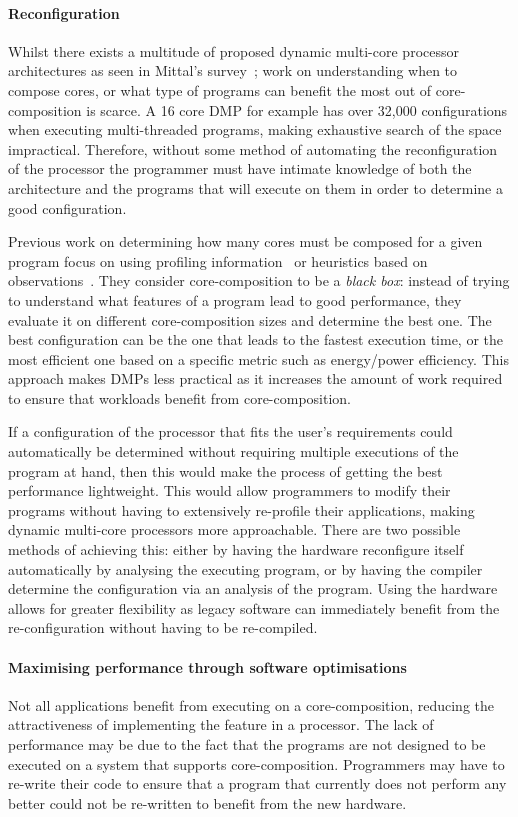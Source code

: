 \paragraph*{Reconfiguration}
Whilst there exists a multitude of proposed dynamic multi-core processor architectures as seen in Mittal's survey~\cite{MittalSurv2016}; work on understanding when to compose cores, or what type of programs can benefit the most out of core-composition is scarce.
A 16 core DMP for example has over 32,000 configurations when executing multi-threaded programs, making exhaustive search of the space impractical.
Therefore, without some method of automating the reconfiguration of the processor the programmer must have intimate knowledge of both the architecture and the programs that will execute on them in order to determine a good configuration.

Previous work on determining how many cores must be composed for a given program focus on using profiling information~\cite{pricopiSchedCoreComp2014} or heuristics based on observations~\cite{gulati2008multitaskingdmc}.
They consider core-composition to be a \textit{black box}: instead of trying to understand what features of a program lead to good performance, they evaluate it on different core-composition sizes and determine the best one.
The best configuration can be the one that leads to the fastest execution time, or the most efficient one based on a specific metric such as energy/power efficiency.
This approach makes DMPs less practical as it increases the amount of work required to ensure that workloads benefit from core-composition.

If a configuration of the processor that fits the user's requirements could automatically be determined without requiring multiple executions of the program at hand, then this would make the process of getting the best performance lightweight.
This would allow programmers to modify their programs without having to extensively re-profile their applications, making dynamic multi-core processors more approachable.
There are two possible methods of achieving this: either by having the hardware reconfigure itself automatically by analysing the executing program, or by having the compiler determine the configuration via an analysis of the program.
Using the hardware allows for greater flexibility as legacy software can immediately benefit from the re-configuration without having to be re-compiled.

\paragraph*{Maximising performance through software optimisations}
Not all applications benefit from executing on a core-composition, reducing the attractiveness of implementing the feature in a processor.
The lack of performance may be due to the fact that the programs are not designed to be executed on a system that supports core-composition.
Programmers may have to re-write their code to ensure that a program that currently does not perform any better could not be re-written to benefit from the new hardware.

